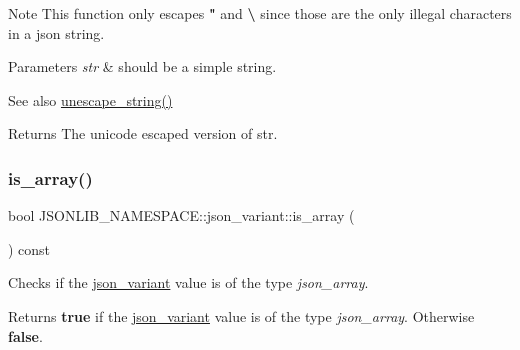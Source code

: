 \begin{DoxyNote}{Note}
This function only escapes {\bfseries "} and {\bfseries \textbackslash{}} since those are the only illegal characters in a json string. 
\end{DoxyNote}

\begin{DoxyParams}{Parameters}
{\em str} & should be a simple string. \\
\hline
\end{DoxyParams}
\begin{DoxySeeAlso}{See also}
\hyperlink{classJSONLIB__NAMESPACE_1_1json__variant_ab3b411443074a97949b5675676d0b136}{unescape\+\_\+string()} 
\end{DoxySeeAlso}
\begin{DoxyReturn}{Returns}
The unicode escaped version of {\ttfamily str}. 
\end{DoxyReturn}
\mbox{\label{classJSONLIB__NAMESPACE_1_1json__variant_a72349dff71a411ac24eea6d943772df7}} 
\subsubsection{\texorpdfstring{is\+\_\+array()}{is\_array()}\hspace{0.1cm}{\footnotesize\ttfamily [1/2]}}
{\footnotesize\ttfamily bool J\+S\+O\+N\+L\+I\+B\+\_\+\+N\+A\+M\+E\+S\+P\+A\+C\+E\+::json\+\_\+variant\+::is\+\_\+array (\begin{DoxyParamCaption}{ }\end{DoxyParamCaption}) const}



Checks if the \hyperlink{classJSONLIB__NAMESPACE_1_1json__variant}{json\+\_\+variant} value is of the type {\itshape json\+\_\+array}. 

\begin{DoxyReturn}{Returns}
{\bfseries true} if the \hyperlink{classJSONLIB__NAMESPACE_1_1json__variant}{json\+\_\+variant} value is of the type {\itshape json\+\_\+array}. Otherwise {\bfseries false}. 
\end{DoxyReturn}
\mbox{\label{classJSONLIB__NAMESPACE_1_1json__variant_a72349dff71a411ac24eea6d943772df7}} 
